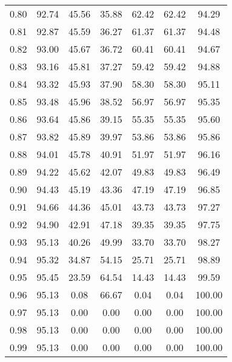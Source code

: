 \begin{tabular}{|c|c|c|c|c|c|c|}
      0.80 &     92.74 &     45.56 &      35.88 &   62.42 &      62.42 &         94.29 \\
      0.81 &     92.87 &     45.59 &      36.27 &   61.37 &      61.37 &         94.48 \\
      0.82 &     93.00 &     45.67 &      36.72 &   60.41 &      60.41 &         94.67 \\
      0.83 &     93.16 &     45.81 &      37.27 &   59.42 &      59.42 &         94.88 \\
      0.84 &     93.32 &     45.93 &      37.90 &   58.30 &      58.30 &         95.11 \\
      0.85 &     93.48 &     45.96 &      38.52 &   56.97 &      56.97 &         95.35 \\
      0.86 &     93.64 &     45.86 &      39.15 &   55.35 &      55.35 &         95.60 \\
      0.87 &     93.82 &     45.89 &      39.97 &   53.86 &      53.86 &         95.86 \\
      0.88 &     94.01 &     45.78 &      40.91 &   51.97 &      51.97 &         96.16 \\
      0.89 &     94.22 &     45.62 &      42.07 &   49.83 &      49.83 &         96.49 \\
      0.90 &     94.43 &     45.19 &      43.36 &   47.19 &      47.19 &         96.85 \\
      0.91 &     94.66 &     44.36 &      45.01 &   43.73 &      43.73 &         97.27 \\
      0.92 &     94.90 &     42.91 &      47.18 &   39.35 &      39.35 &         97.75 \\
      0.93 &     95.13 &     40.26 &      49.99 &   33.70 &      33.70 &         98.27 \\
      0.94 &     95.32 &     34.87 &      54.15 &   25.71 &      25.71 &         98.89 \\
      0.95 &     95.45 &     23.59 &      64.54 &   14.43 &      14.43 &         99.59 \\
      0.96 &     95.13 &      0.08 &      66.67 &    0.04 &       0.04 &        100.00 \\
      0.97 &     95.13 &      0.00 &       0.00 &    0.00 &       0.00 &        100.00 \\
      0.98 &     95.13 &      0.00 &       0.00 &    0.00 &       0.00 &        100.00 \\
      0.99 &     95.13 &      0.00 &       0.00 &    0.00 &       0.00 &        100.00 \\
\bottomrule
\end{tabular}
